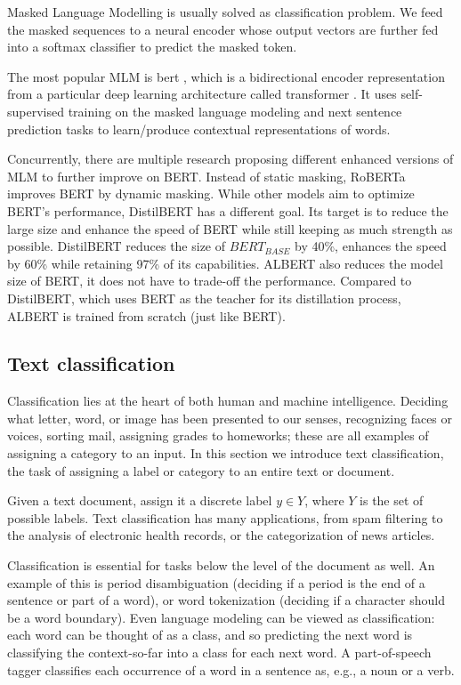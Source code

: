 Masked Language Modelling is usually solved as classification problem. We feed the masked
sequences to a neural encoder whose output vectors are further fed into a softmax classifier to predict the masked token.

The most popular MLM is \acrshort{bert} \cite{devlin2018bert}, which is a bidirectional encoder representation from a particular deep learning architecture called \gls{transformer} \cite{vaswani2017attention}. 
It uses self-supervised training on the masked language modeling and next sentence prediction tasks to learn/produce contextual representations of words.

Concurrently, there are multiple research proposing different enhanced versions of MLM to further improve on BERT. Instead
of static masking, RoBERTa \cite{liu2019roberta} improves BERT by dynamic masking.
While other models aim to optimize BERT's performance, DistilBERT has a different goal. Its target is to reduce the large size and enhance the speed of BERT while still keeping as much strength as possible.
DistilBERT \cite{sanh2019distilbert} reduces the size of $BERT_{BASE}$ by 40\%, enhances the speed by 60\% while retaining 97\% of its capabilities.
ALBERT \cite{lan2019albert} also reduces the model size of BERT, it does not have to trade-off the performance. Compared to DistilBERT, which uses BERT as the teacher for its distillation process, ALBERT is trained from scratch (just like BERT).

\subsection{Text classification}\label{subsec:text-classification}

Classification lies at the heart of both human and machine intelligence. Deciding what letter, word, or image has been presented to our senses, recognizing faces or voices, sorting mail, assigning grades to homeworks; these are all examples of assigning a category to an input.
In this section we introduce text classification, the task of assigning a label or category to an entire text or document.

Given a text document, assign it a discrete label $y \in Y$, where $Y$ is the set of possible labels. 
Text classification has many applications, from spam filtering to the analysis of electronic health records, or the categorization of news articles.

Classification is essential for tasks below the level of the document as well.
An example of this is period disambiguation (deciding if a period is the end of a sentence or part of a word), or word tokenization (deciding if a character should be a word boundary). Even language modeling can be viewed as classification: each word can be thought of as a class, and so predicting the next word is classifying the context-so-far into a class for each next word. A part-of-speech tagger classifies each occurrence of a word in a sentence as, e.g., a noun or a verb.

